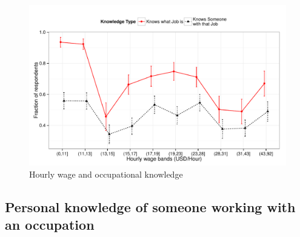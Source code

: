\documentclass[11pt]{article}
\begin{document}
\begin{figure}
\caption{Hourly wage and occupational knowledge \label{fig:knowledge_by_wage}} 
\centering
\begin{minipage}{0.95 \linewidth}
\includegraphics[width = \linewidth]{./plots/knowledge_by_wage.pdf}
\end{minipage}  
\end{figure} 

\subsection{Personal knowledge of someone working with an occupation} 
\end{document}
